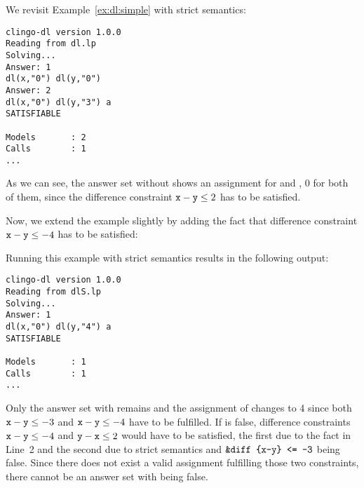 \begin{example}\label{ex:dl:strict}
We revisit Example~\ref{ex:dl:simple} with strict semantics:
\begin{lstlisting}[numbers=none]
clingo-dl version 1.0.0
Reading from dl.lp
Solving...
Answer: 1
dl(x,"0") dl(y,"0")
Answer: 2
dl(x,"0") dl(y,"3") a
SATISFIABLE

Models       : 2
Calls        : 1
...
\end{lstlisting}
As we can see, the answer set without  shows an assignment for  and ,
0 for both of them, since the difference constraint $\texttt{x}-\texttt{y}\leq2$ has to be satisfied.

Now, we extend the example slightly by adding the fact that difference constraint $\texttt{x}-\texttt{y}\leq -4$ has to be satisfied:

Running this example with strict semantics results in the following output:
\begin{lstlisting}[numbers=none]
clingo-dl version 1.0.0
Reading from dlS.lp
Solving...
Answer: 1
dl(x,"0") dl(y,"4") a
SATISFIABLE

Models       : 1
Calls        : 1
...
\end{lstlisting}

Only the answer set with  remains and the assignment of  changes to 4 
since both $\texttt{x}-\texttt{y}\leq -3$ and $\texttt{x}-\texttt{y}\leq -4$ have to be fulfilled.
If  is false, difference constraints $\texttt{x}-\texttt{y}\leq -4$ and $\texttt{y}-\texttt{x}\leq 2$ would have to be satisfied,
the first due to the fact in Line~2 and the second due to strict semantics and $\texttt{\&diff\text{ }\{x-y\}\text{ }<=\text{ }-3}$ being false.
Since there does not exist a valid assignment fulfilling those two constraints, there cannot be an answer set with  being false.

\end{example}

